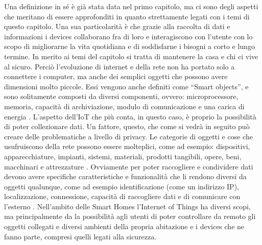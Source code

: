 Una definizione in sé è già stata data nel primo capitolo, ma ci sono degli aspetti che meritano di essere approfonditi in quanto strettamente legati con i temi di questo capitolo.
Una sua particolarità è che grazie alla raccolta di dati e informazioni i devices collaborano fra di loro e interagiscono con l’utente con lo scopo di migliorarne la vita quotidiana e di soddisfarne i bisogni a corto e lungo termine. In merito ai temi del capitolo si tratta di mantenere la casa e chi ci vive al sicuro. Perciò l’evoluzione di internet e della rete non ha portato solo a connettere i computer, ma anche dei semplici oggetti che possono avere dimensioni molto piccole. Essi vengono anche definiti come “Smart objects”, e sono solitamente composti da diversi componenti, ovvero: microprocessore, memoria, capacità di archiviazione, modulo di comunicazione e una carica di energia . L’aspetto dell’IoT che più conta, in questo caso, è proprio la possibilità di poter collezionare dati. Un fattore, questo, che come si vedrà in seguito può creare delle problematiche a livello di privacy.
Le categorie di oggetti e cose che usufruiscono della rete possono essere molteplici, come ad esempio: dispositivi, apparecchiature, impianti, sistemi, materiali, prodotti tangibili, opere, beni, macchinari e attrezzature . Ovviamente per poter raccogliere e condividere dati devono avere specifiche caratteristiche e funzionalità che li rendono diversi da oggetti qualunque, come ad esempio identificazione (come un indirizzo IP), localizzazione, connessione, capacità di raccogliere dati e di comunicare con l’esterno  . Nell’ambito delle Smart Homes l’Internet of Things ha diversi scopi, ma principalmente da la possibilità agli utenti di poter controllare da remoto gli oggetti collegati e diversi ambienti della propria abitazione e i devices che ne fanno parte, compresi quelli legati alla sicurezza. 
